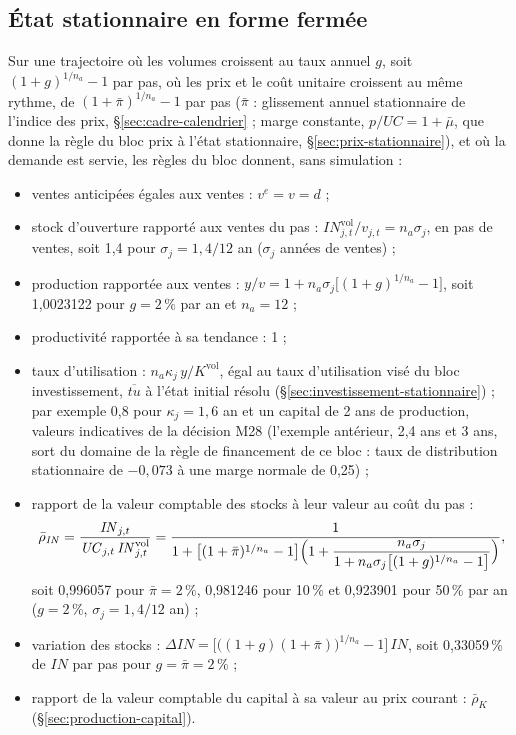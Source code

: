 \documentclass[11pt,a4paper]{article}
\begin{document}
\subsection{État stationnaire en forme fermée}
\label{sec:production-stationnaire}
Sur une trajectoire où les volumes croissent au taux annuel $g$, soit $(1 + g)^{1/n_a} - 1$ par pas, où les prix et le coût unitaire croissent au même rythme, de $(1 + \bar\pi)^{1/n_a} - 1$ par pas ($\bar\pi$ : glissement annuel stationnaire de l'indice des prix, \S\ref{sec:cadre-calendrier} ; marge constante, $p/\mathit{UC} = 1 + \bar\mu$, que donne la règle du bloc prix à l'état stationnaire, \S\ref{sec:prix-stationnaire}), et où la demande est servie, les règles du bloc donnent, sans simulation :
\begin{itemize}
\item ventes anticipées égales aux ventes : $v^e = v = d$ ;
\item stock d'ouverture rapporté aux ventes du pas : $\mathit{IN}^{\mathrm{vol}}_{j,t}/v_{j,t} = n_a \sigma_j$, en pas de ventes, soit 1,4 pour $\sigma_j = 1{,}4/12$ an ($\sigma_j$ années de ventes) ;
\item production rapportée aux ventes : $y/v = 1 + n_a\sigma_j\bigl[(1 + g)^{1/n_a} - 1\bigr]$, soit 1,0023122 pour $g = 2\,\%$ par an et $n_a = 12$ ;
\item productivité rapportée à sa tendance : 1 ;
\item taux d'utilisation : $n_a \kappa_j\, y/K^{\mathrm{vol}}$, égal au taux d'utilisation visé du bloc investissement, $\overline{\mathit{tu}}$ à l'état initial résolu (\S\ref{sec:investissement-stationnaire}) ; par exemple 0,8 pour $\kappa_j = 1{,}6$ an et un capital de 2 ans de production, valeurs indicatives de la décision M28 (l'exemple antérieur, 2,4 ans et 3 ans, sort du domaine de la règle de financement de ce bloc : taux de distribution stationnaire de $-0{,}073$ à une marge normale de 0,25) ;
\item rapport de la valeur comptable des stocks à leur valeur au coût du pas :
\begin{equation*}
\bar\rho_{\mathit{IN}} = \frac{\mathit{IN}_{j,t}}{\mathit{UC}_{j,t}\,\mathit{IN}^{\mathrm{vol}}_{j,t}} = \frac{1}{1 + \bigl[(1 + \bar\pi)^{1/n_a} - 1\bigr]\Bigl(1 + \dfrac{n_a\sigma_j}{1 + n_a\sigma_j\bigl[(1 + g)^{1/n_a} - 1\bigr]}\Bigr)} ,
\end{equation*}
soit 0,996057 pour $\bar\pi = 2\,\%$, 0,981246 pour 10\,\% et 0,923901 pour 50\,\% par an ($g = 2\,\%$, $\sigma_j = 1{,}4/12$ an) ;
\item variation des stocks : $\Delta\mathit{IN} = \bigl[\bigl((1 + g)(1 + \bar\pi)\bigr)^{1/n_a} - 1\bigr]\,\mathit{IN}$, soit 0,33059\,\% de $\mathit{IN}$ par pas pour $g = \bar\pi = 2\,\%$ ;
\item rapport de la valeur comptable du capital à sa valeur au prix courant : $\bar\rho_K$ (\S\ref{sec:production-capital}).
\end{itemize}
\end{document}

